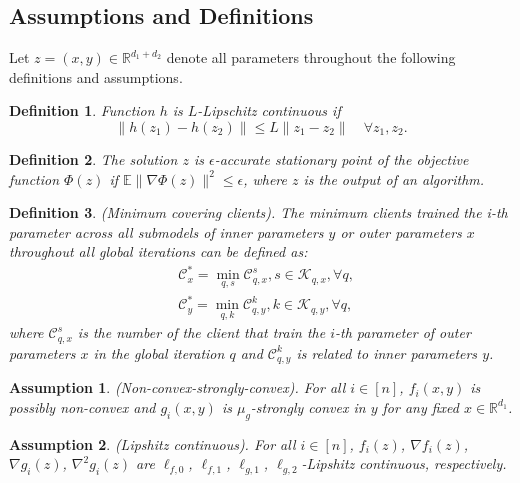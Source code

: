 \documentclass[lettersize,journal]{IEEEtran}
\newtheorem{definition}{Definition}
\newtheorem{assumption}{Assumption}
\begin{document}
\subsection{Assumptions and Definitions}
Let $z=(x,y)\in \mathbb{R}^{d_1+d_2}$ denote all parameters throughout the following definitions and assumptions.

\begin{definition}
    Function $h$ is $L$-Lipschitz continuous if
    \begin{equation}
    \|h(z_1)-h(z_2)\|\leq L\|z_1-z_2\|\quad \forall z_1, z_2.    
    \end{equation}
\end{definition}

\begin{definition}
    The solution $z$ is $\epsilon$-accurate stationary point of the objective function $\Phi(z)$ if $\mathbb{E}\|\nabla\Phi(z)\|^2\leq \epsilon$, where $z$ is the output of an algorithm.
\end{definition}

\begin{definition}
(Minimum covering clients). The minimum clients trained the i-th parameter across all submodels of inner parameters $y$ or outer parameters $x$ throughout all global iterations can be defined as:
\begin{align}
&\mathcal{C}^*_x= \min\limits_{q,s} \mathcal{C}_{q,x}^s, s \in \mathcal{K}_{q,x}, \forall q,\\
&\mathcal{C}^*_y= \min\limits_{q,k} \mathcal{C}_{q,y}^k, k \in \mathcal{K}_{q,y}, \forall q,
\end{align}
where $\mathcal{C}_{q,x}^s$ is the number of the client that train the $i$-th parameter of outer parameters $x$ in the global iteration $q$ and $\mathcal{C}_{q,y}^k$ is related to inner parameters $y$.
\end{definition}
\begin{assumption}(Non-convex-strongly-convex).
\label{assum:convex}
For all $i\in [n]$, $f_i(x,y)$ is possibly non-convex and $g_i(x,y)$ is $\mu_g$-strongly convex in $y$ for any fixed $x\in\mathbb{R}^{d_1}$.
\end{assumption}

\begin{assumption}(Lipshitz continuous).
\label{assum:lipschitz}
For all $i\in[n]$, $f_i(z)$, $\nabla f_i(z)$, $\nabla g_i(z)$, $\nabla^2 g_i(z)$ are $\ell_{f,0}$, $\ell_{f,1}$, $\ell_{g,1}$, $\ell_{g,2}$-Lipshitz continuous, respectively.
\end{assumption}
\end{document}
